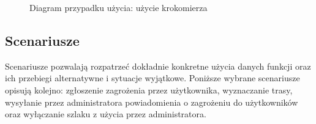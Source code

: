     \setlength{\fboxrule}{0.5pt}
    \begin{figure}[H]
        \centering
        \caption{Diagram przypadku użycia: użycie krokomierza}
        \label{ucd:krokomierz}
    \end{figure}
    
    
    \subsection{Scenariusze}
    Scenariusze pozwalają rozpatrzeć dokładnie konkretne użycia danych funkcji oraz ich przebiegi alternatywne i sytuacje wyjątkowe. Poniższe wybrane scenariusze opisują kolejno: zgłoszenie zagrożenia przez użytkownika, wyznaczanie trasy, wysyłanie przez administratora powiadomienia o zagrożeniu do użytkowników oraz wyłączanie szlaku z użycia przez administratora.
